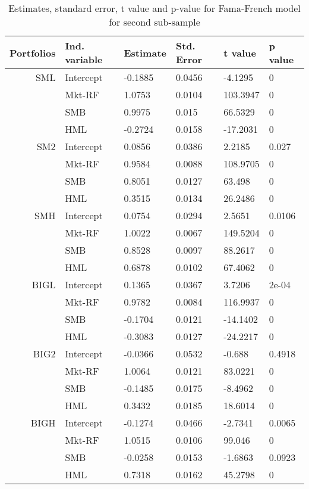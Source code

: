 \documentclass[11pt]{article}
\begin{document}
\begin{table}[ht]
\centering
\begin{tabular}{rlllll}
  \hline
 Portfolios&Ind. variable& Estimate & Std. Error & t value & p value \\ 
  \hline
SML & Intercept & -0.1885 & 0.0456 & -4.1295 & 0 \\ 
   & Mkt-RF & 1.0753 & 0.0104 & 103.3947 & 0 \\ 
   & SMB & 0.9975 & 0.015 & 66.5329 & 0 \\ 
   & HML & -0.2724 & 0.0158 & -17.2031 & 0 \\ 
  SM2 & Intercept & 0.0856 & 0.0386 & 2.2185 & 0.027 \\ 
   & Mkt-RF & 0.9584 & 0.0088 & 108.9705 & 0 \\ 
  & SMB & 0.8051 & 0.0127 & 63.498 & 0 \\ 
   & HML & 0.3515 & 0.0134 & 26.2486 & 0 \\ 
  SMH & Intercept & 0.0754 & 0.0294 & 2.5651 & 0.0106 \\ 
   & Mkt-RF & 1.0022 & 0.0067 & 149.5204 & 0 \\ 
   & SMB & 0.8528 & 0.0097 & 88.2617 & 0 \\ 
   & HML & 0.6878 & 0.0102 & 67.4062 & 0 \\ 
  BIGL & Intercept & 0.1365 & 0.0367 & 3.7206 & 2e-04 \\ 
   & Mkt-RF & 0.9782 & 0.0084 & 116.9937 & 0 \\ 
   & SMB & -0.1704 & 0.0121 & -14.1402 & 0 \\ 
   & HML & -0.3083 & 0.0127 & -24.2217 & 0 \\ 
  BIG2 & Intercept & -0.0366 & 0.0532 & -0.688 & 0.4918 \\ 
   & Mkt-RF & 1.0064 & 0.0121 & 83.0221 & 0 \\ 
   & SMB & -0.1485 & 0.0175 & -8.4962 & 0 \\ 
   & HML & 0.3432 & 0.0185 & 18.6014 & 0 \\ 
  BIGH & Intercept & -0.1274 & 0.0466 & -2.7341 & 0.0065 \\ 
   & Mkt-RF & 1.0515 & 0.0106 & 99.046 & 0 \\ 
   & SMB & -0.0258 & 0.0153 & -1.6863 & 0.0923 \\ 
   & HML & 0.7318 & 0.0162 & 45.2798 & 0 \\ 
   \hline
\end{tabular}
\caption{ Estimates, standard error, t value and p-value for Fama-French model for second sub-sample}\label{tab6}
\end{table}
\end{document}
